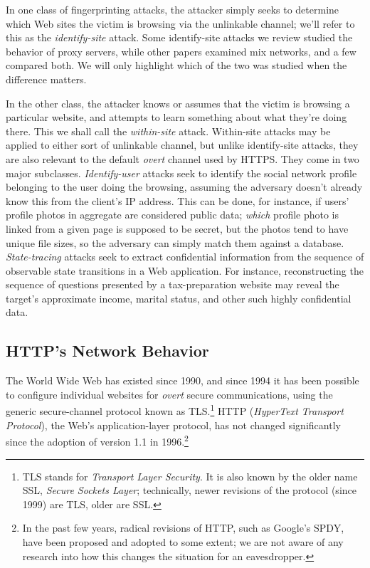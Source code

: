 In one class of fingerprinting attacks, the attacker simply seeks to
determine which Web sites the victim is browsing via the unlinkable
channel; we'll refer to this as the \emph{identify-site} attack.  Some
identify-site attacks we review studied the behavior of proxy servers,
while other papers examined mix networks, and a few compared both.  We
will only highlight which of the two was studied when the difference
matters.

In the other class, the attacker knows or assumes that the victim is
browsing a particular website, and attempts to learn something about
what they're doing there.  This we shall call the \emph{within-site}
attack.  Within-site attacks may be applied to either sort of
unlinkable channel, but unlike identify-site attacks, they are also
relevant to the default \emph{overt} channel used by HTTPS.  They come
in two major subclasses.  \emph{Identify-user} attacks seek to
identify the social network profile belonging to the user doing the
browsing, assuming the adversary doesn't already know this from the
client's IP address.  This can be done, for instance, if users'
profile photos in aggregate are considered public data; \emph{which}
profile photo is linked from a given page is supposed to be secret,
but the photos tend to have unique file sizes, so the adversary can
simply match them against a
database.~\cite{herrmann2012analyzing,pironti2012identifying}
\emph{State-tracing} attacks seek to extract confidential information
from the sequence of observable state transitions in a Web
application.  For instance, reconstructing the sequence of questions
presented by a tax-preparation website may reveal the target's
approximate income, marital status, and other such highly confidential
data.~\cite{zhang2010sidebuster}

\subsection{HTTP's Network Behavior}

The World Wide Web has existed since 1990, and since 1994 it has been
possible to configure individual websites for \emph{overt} secure
communications, using the generic secure-channel protocol known as
TLS.\footnote{TLS stands for \emph{Transport Layer Security}. It is
  also known by the older name SSL, \emph{Secure Sockets Layer};
  technically, newer revisions of the protocol (since 1999) are TLS,
  older are SSL.}  HTTP (\emph{HyperText Transport Protocol}), the
Web's application-layer protocol, has not changed significantly since
the adoption of version 1.1 in 1996.\footnote{In the past few years,
  radical revisions of HTTP, such as Google's SPDY, have been proposed
  and adopted to some extent; we are not aware of any research into
  how this changes the situation for an eavesdropper.}

